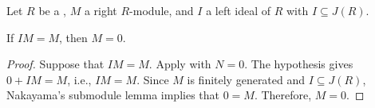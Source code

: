 \begin{lemma}  \label{lemma:nakayamas_lemma_for_finitely_generated_modules_over_a_ring_with_ideal_in_jacobson_radical}
	Let $R$ be a , $M$ a  right $R$-module, and $I$ a left ideal of $R$ with $I \subseteq J(R)$.

	If $IM = M$, then $M = 0$.
\end{lemma}
\begin{proof}
	Suppose that $IM = M$. Apply  with $N = 0$. The hypothesis gives $0 + IM = M$, i.e., $IM = M$. Since $M$ is finitely generated and $I \subseteq J(R)$, Nakayama's submodule lemma implies that $0 = M$. Therefore, $M = 0$.
\end{proof}
